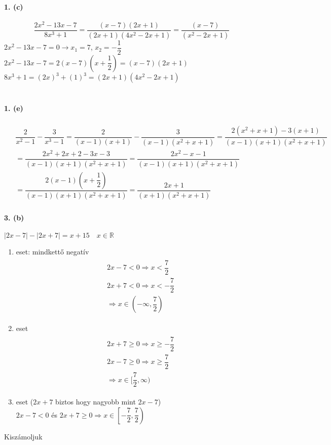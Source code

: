 \documentclass[12pt,a4paper,fleqn]{article}
\newcommand{\myparagraph}[1]{\paragraph{#1}\mbox{}}
\begin{document}
\myparagraph{1. (c)}
$$ \dfrac{2x^2-13x-7}{8x^3+1} = \dfrac{(x-7)(2x+1)}{(2x+1)(4x^2-2x+1)} = \dfrac{(x-7)}{(x^2-2x+1)}$$
$2x^2-13x-7=0 \rightarrow x_1 = 7$, $x_2 = -\dfrac{1}{2}$ \\
$2x^2-13x-7=2(x-7)(x+\dfrac{1}{2})=(x-7)(2x+1)$ \\
$ 8x^3 + 1 = (2x)^3 + (1)^3 = (2x+1)(4x^2-2x+1)$ \\\\
\myparagraph{1. (e)}
\begin{align*}
  \begin{split}
    & \dfrac{2}{x^2-1} -\dfrac{3}{x^3-1} = \dfrac{2}{(x-1)(x+1)} - \dfrac{3}{(x-1)(x^2+x+1)} = \dfrac{2(x^2+x+1)-3(x+1)}{(x-1)(x+1)(x^2+x+1)} \\[10pt]
    &= \dfrac{2x^2+2x+2-3x-3}{(x-1)(x+1)(x^2+x+1)} = \dfrac{2x^2-x-1}{(x-1)(x+1)(x^2+x+1)} \\[10pt]
    &= \dfrac{2(x-1)(x+\dfrac{1}{2})}{(x-1)(x+1)(x^2+x+1)} = \dfrac{2x+1}{(x+1)(x^2+x+1)}
  \end{split}
\end{align*}
\myparagraph{3. (b)}
$|2x-7|-|2x+7|=x+15 \quad x \in \mathbb{R}$
\begin{enumerate}
  \item eset: mindkettő negatív
  \begin{align*}
    \begin{split}
      &2x - 7 < 0 \Rightarrow x < \dfrac{7}{2} \\
      &2x + 7 < 0 \Rightarrow x < -\dfrac{7}{2} \\
      &\Longrightarrow x \in (-\infty, \dfrac{7}{2})
    \end{split}
  \end{align*}
  \item eset
  \begin{align*}
    \begin{split}
      &2x + 7 \geq 0 \Rightarrow x \geq -\dfrac{7}{2} \\
      &2x - 7 \geq 0 \Rightarrow x \geq \dfrac{7}{2} \\
      &\Longrightarrow x \in [\dfrac{7}{2}, \infty)
    \end{split}
  \end{align*}
  \item eset ($2x+7$ biztos hogy nagyobb mint $2x-7$) \\
  $2x-7<0$ és $2x+7 \geq 0 \Rightarrow x \in \left[ -\dfrac{7}{2}, \dfrac{7}{2} \right)$
\end{enumerate}
Kiszámoljuk
\end{document}
